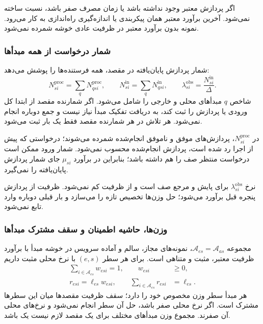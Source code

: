 اگر پردازش معتبر وجود نداشته باشد یا زمان مصرف صفر باشد، نسبت ساخته نمی‌شود. آخرین برآورد معتبر همان پیکربندی یا اندازه‌گیری راه‌اندازی به کار می‌رود. نمونه بدون برآورد معتبر در ظرفیت عادی خوشه شمرده نمی‌شود.

\subsubsection{شمار درخواست از همه مبدأها}

شمار پردازش پایان‌یافته در مقصد، همه فرستنده‌ها را پوشش می‌دهد:
\begin{equation}
 N^{\mathrm{proc}}_{si}=\sum_qN^{\mathrm{proc}}_{qsi},\qquad
 N^{\mathrm{in}}_{si}=\sum_qN^{\mathrm{in}}_{qsi},\qquad
 \lambda^{\mathrm{obs}}_{si}=\frac{N^{\mathrm{in}}_{si}}{\Delta}.
 \label{eq:all-source-observation}
\end{equation}
شاخص $q$ مبدأهای محلی و خارجی را شامل می‌شود. اگر شمارنده مقصد از ابتدا کل ورودی یا پردازش را ثبت کند، به دریافت تفکیک مبدأ نیاز نیست و جمع دوباره انجام نمی‌شود. هر تلاش در هر شمارنده مقصد فقط یک بار ثبت می‌شود.

در $N^{\mathrm{proc}}_{si}$، پردازش‌های موفق و ناموفق انجام‌شده شمرده می‌شوند؛ درخواستی که پیش از اجرا رد شده است، پردازش انجام‌شده محسوب نمی‌شود. شمار ورود ممکن است درخواست منتظر صف را هم داشته باشد؛ بنابراین در برآورد $\mu_{si}$ جای شمار پردازش پایان‌یافته را نمی‌گیرد.

نرخ $\lambda^{\mathrm{obs}}_{si}$ برای پایش و مرجع صف است و از ظرفیت کم نمی‌شود. ظرفیت از پردازش پنجره قبل برآورد می‌شود؛ حل وزن‌ها تخصیص تازه را می‌سازد و بار قبلی دوباره وارد تابع نمی‌شود.

\subsubsection{وزن‌ها، حاشیه اطمینان و سقف مشترک مبدأها}

مجموعه $\mathcal A_{es}=\mathcal A_{as}$، نمونه‌های مجاز، سالم و آماده سرویس در خوشه مبدأ با برآورد ظرفیت معتبر، مثبت و متناهی است. برای هر سطر $(e,s)$ با نرخ محلی مثبت داریم
\begin{align}
 \sum_{i\in\mathcal A_{es}}w_{esi}=1,\qquad w_{esi}&\geq0,
 \label{eq:row-weights}\\
 r_{esi}=\ell_{es}w_{esi},\qquad
 \sum_{i\in\mathcal A_{es}}r_{esi}&=\ell_{es}.
 \label{eq:load-weight}
\end{align}
هر مبدأ سطر وزن مخصوص خود را دارد؛ سقف ظرفیت مقصدها میان این سطرها مشترک است. اگر نرخ محلی صفر باشد، حل آن سطر انجام نمی‌شود و نرخ‌های محلی آن صفرند. مجموع وزن مبدأهای مختلف برای یک مقصد لازم نیست یک باشد.

